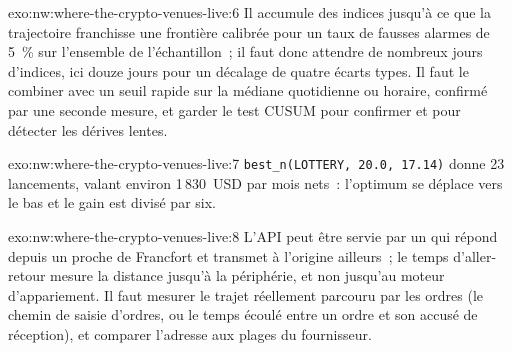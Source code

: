 \begin{solution}{exo:nw:where-the-crypto-venues-live:6}
Il accumule des indices jusqu'à ce que la trajectoire franchisse une frontière calibrée pour un taux de fausses alarmes de 5~\% sur l'ensemble de
l'échantillon~; il faut donc attendre de nombreux jours d'indices, ici douze jours pour un décalage de quatre écarts types. Il faut le combiner avec un
seuil rapide sur la médiane quotidienne ou horaire, confirmé par une seconde mesure, et garder le test CUSUM pour confirmer et pour détecter les dérives lentes.
\end{solution}

\begin{solution}{exo:nw:where-the-crypto-venues-live:7}
\texttt{best\_n(LOTTERY, 20.0, 17.14)} donne 23 lancements, valant environ 1\,830~USD par mois nets~: l'optimum se déplace vers le bas et le gain est divisé
par six.
\end{solution}

\begin{solution}{exo:nw:where-the-crypto-venues-live:8}
L'API peut être servie par un  qui répond depuis un  proche de Francfort et transmet à l'origine ailleurs~; le
temps d'aller-retour mesure la distance jusqu'à la périphérie, et non jusqu'au moteur d'appariement. Il faut mesurer le trajet réellement parcouru par les
ordres (le chemin de saisie d'ordres, ou le temps écoulé entre un ordre et son accusé de réception), et comparer l'adresse aux plages du fournisseur.
\end{solution}

